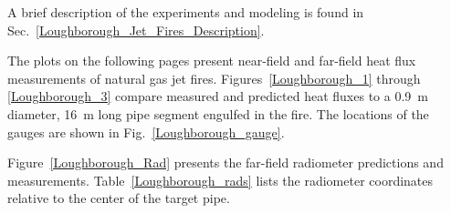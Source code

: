 A brief description of the experiments and modeling is found in Sec.~\ref{Loughborough_Jet_Fires_Description}.

The plots on the following pages present near-field and far-field heat flux measurements of natural gas jet fires. Figures~\ref{Loughborough_1} through \ref{Loughborough_3} compare measured and predicted heat fluxes to a 0.9~m diameter, 16~m long pipe segment engulfed in the fire. The locations of the gauges are shown in Fig.~\ref{Loughborough_gauge}.

Figure~\ref{Loughborough_Rad} presents the far-field radiometer predictions and measurements. Table~\ref{Loughborough_rads} lists the radiometer coordinates relative to the center of the target pipe.

\begin{figure}[!ht]


\end{figure}
